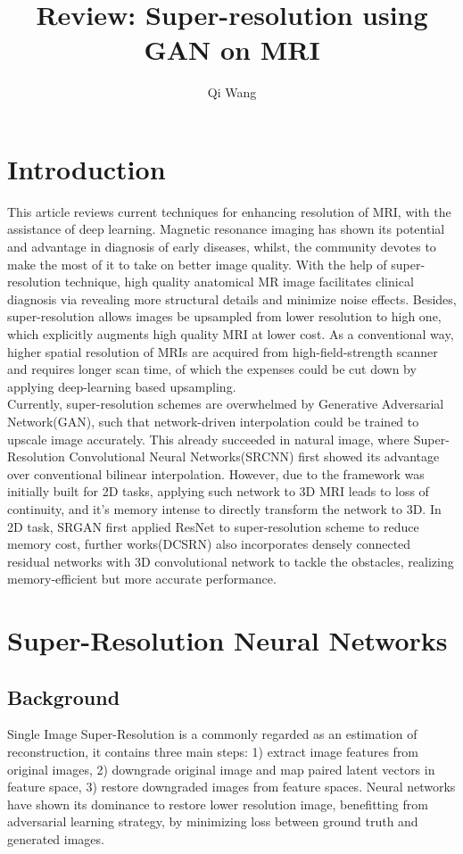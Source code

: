 \documentclass{article}
\begin{document}
\title{Review: Super-resolution using GAN on MRI}
\author{Qi Wang}
\maketitle
\section{Introduction}
This article reviews current techniques for enhancing resolution of MRI, with the assistance of deep learning. Magnetic resonance imaging has shown its potential and advantage in diagnosis of early diseases, whilst, the community devotes to make the most of it to take on better image quality. With the help of super-resolution technique, high quality anatomical MR image facilitates clinical diagnosis via revealing more structural details and minimize noise effects. Besides, super-resolution allows images be upsampled from lower resolution to high one, which explicitly augments high quality MRI at lower cost. As a conventional way, higher spatial resolution of MRIs are acquired from high-field-strength scanner and requires longer scan time,  of which the expenses could be cut down by applying deep-learning based upsampling. \\

Currently, super-resolution schemes are overwhelmed by Generative Adversarial Network(GAN), such that network-driven interpolation could be trained to upscale image accurately. This already succeeded in natural image, where Super-
Resolution Convolutional Neural Networks(SRCNN) first showed its advantage over conventional bilinear interpolation. However, due to the framework was initially built for 2D tasks, applying such network to 3D MRI leads to loss of continuity, and it's memory intense to directly transform the network to 3D. In 2D task, SRGAN first applied ResNet to super-resolution scheme to reduce memory cost, further works(DCSRN) also incorporates densely connected residual networks with 3D convolutional network to tackle the obstacles, realizing memory-efficient but more accurate performance.  


\section{Super-Resolution Neural Networks}
\subsection{Background}
Single Image Super-Resolution is a commonly regarded as an estimation of reconstruction, it contains three main steps: 1) extract image features from original images, 2) downgrade original image and map paired latent vectors in feature space, 3) restore downgraded images from feature spaces. Neural networks have shown its dominance to restore lower resolution image, benefitting from adversarial learning strategy, by minimizing loss between ground truth and generated images. \\
\end{document}
